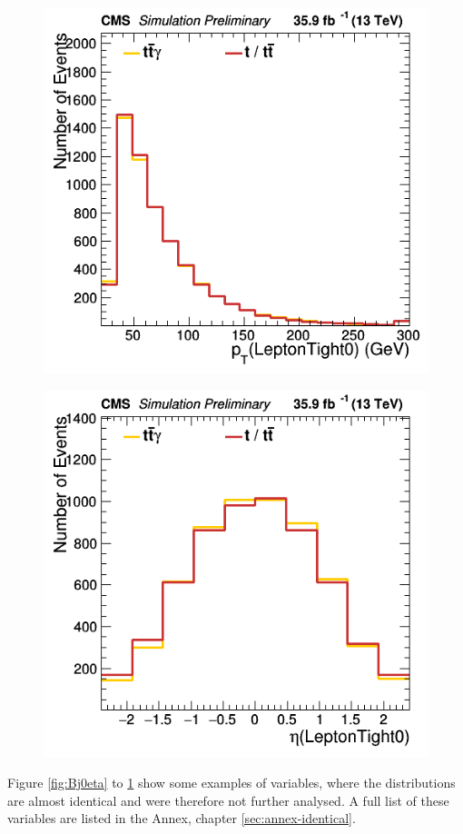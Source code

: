 \documentclass[11pt]{scrartcl}
\begin{document}
\begin{figure}[H]
\centering
\begin{minipage}{.5\textwidth}
  \centering
  \includegraphics[width=0.75\linewidth]{figures/Notused/LeptonTight0_pt.png}
  \label{fig:LeptonTight0pt}
\end{minipage}%
\begin{minipage}{.5\textwidth}
  \centering
  \includegraphics[width=0.75\linewidth]{figures/Notused/LeptonTight0_eta.png}
  \label{fig:LeptonTight0eta}
\end{minipage}
\end{figure}

Figure \ref{fig:Bj0eta} to \ref{fig:LeptonTight0eta} show some examples of variables, where the distributions are almost identical and were therefore not further analysed. A full list of these variables are listed in the Annex, chapter \ref{sec:annex-identical}. 
\end{document}
